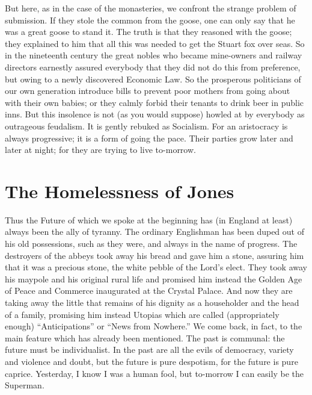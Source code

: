 \documentclass{book}
\begin{document}
But here, as in the case of the monasteries, we confront the strange problem of submission. If they stole the common from the goose, one can only say that he was a great goose to stand it. The truth is that they reasoned with the goose; they explained to him that all this was needed to get the Stuart fox over seas. So in the nineteenth century the great nobles who became mine-owners and railway directors earnestly assured everybody that they did not do this from preference, but owing to a newly discovered Economic Law. So the prosperous politicians of our own generation introduce bills to prevent poor mothers from going about with their own babies; or they calmly forbid their tenants to drink beer in public inns. But this insolence is not (as you would suppose) howled at by everybody as outrageous feudalism. It is gently rebuked as Socialism. For an aristocracy is always progressive; it is a form of going the pace. Their parties grow later and later at night; for they are trying to live to-morrow.

\chapter{The Homelessness of Jones}
\label{chapter-12}
Thus the Future of which we spoke at the beginning has (in England at least) always been the ally of tyranny. The ordinary Englishman has been duped out of his old possessions, such as they were, and always in the name of progress. The destroyers of the abbeys took away his bread and gave him a stone, assuring him that it was a precious stone, the white pebble of the Lord’s elect. They took away his maypole and his original rural life and promised him instead the Golden Age of Peace and Commerce inaugurated at the Crystal Palace. And now they are taking away the little that remains of his dignity as a householder and the head of a family, promising him instead Utopias which are called (appropriately enough) “Anticipations” or “News from Nowhere.” We come back, in fact, to the main feature which has already been mentioned. The past is communal: the future must be individualist. In the past are all the evils of democracy, variety and violence and doubt, but the future is pure despotism, for the future is pure caprice. Yesterday, I know I was a human fool, but to-morrow I can easily be the Superman.
\end{document}
